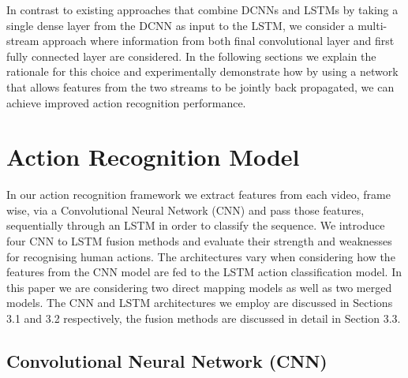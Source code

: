 \documentclass[10pt,twocolumn,letterpaper]{article}
\begin{document}
	
	In contrast to existing approaches that combine DCNNs and LSTMs by taking a single dense layer from the DCNN as input to the LSTM, we consider a multi-stream approach where information from both final convolutional layer and first fully connected layer are considered. In the following sections we explain the rationale for this choice and experimentally demonstrate how by using a network that allows features from the two streams to be jointly back propagated, we can achieve improved action recognition performance.    	    


   
\section{Action Recognition Model}

 In our action recognition framework we extract features from each video, frame wise, via a Convolutional Neural Network (CNN) and pass those features, sequentially through an LSTM in order to classify the sequence. We introduce four CNN to LSTM fusion methods and evaluate their strength and weaknesses for recognising human actions. The architectures vary when considering how the features from the CNN model are fed to the LSTM action classification model. In this paper we are considering two direct mapping models as well as two merged models. The CNN and LSTM architectures we employ are discussed in Sections 3.1 and 3.2 respectively, the fusion methods are discussed in detail in Section 3.3.
   
\subsection{Convolutional Neural Network (CNN)}
\end{document}

